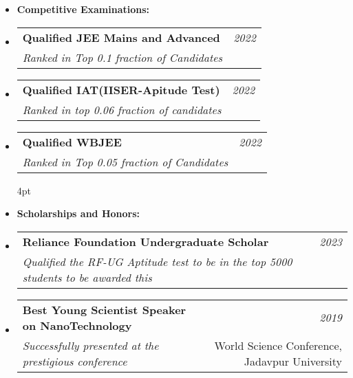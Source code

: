 \documentclass[a4paper,11pt]{article}
\makeatletter
\newcommand{\resumeSubheading}[4]{
    \item\small{
        \begin{tabular*}{0.97\textwidth}[t]{l@{\extracolsep{\fill}}r}
            \textbf{#1} & \textit{#2} \\
            \textit{#3} & \small{#4}
        \end{tabular*}
    }\vspace{3pt}
}
\newcommand{\denseList}[1]{
    \begin{customitemize}[leftmargin=5pt,nosep,itemsep=0.5pt]
        #1
    \end{customitemize}\vspace{1pt}
}
\makeatother
\begin{document}
{\begin{itemize}[leftmargin=*,label={},itemsep=4pt]
\begin{itemize}[nosep, label ={}]
    \item \textbf{Competitive Examinations:}
    \resumeSubheading{Qualified JEE Mains and Advanced}{2022}
    {Ranked in Top 0.1 fraction of Candidates}{}\vspace{-4pt}
    \resumeSubheading{Qualified IAT(IISER-Apitude Test)}{2022}
    {Ranked in top 0.06 fraction of candidates}{}\vspace{-4pt}
    \resumeSubheading{Qualified WBJEE}{2022}
    {Ranked in Top 0.05 fraction of Candidates}

    

    \vspace{4pt}\item \textbf{Scholarships and Honors:}
    \resumeSubheading{Reliance Foundation Undergraduate Scholar}{2023}
    {Qualified the RF-UG Aptitude test to be in the top 5000 students to be awarded this} {}\vspace{-2pt}
    \resumeSubheading{Best Young Scientist Speaker on NanoTechnology}{2019}
    {Successfully presented at the prestigious conference }{World Science Conference, Jadavpur University}
    
\end{itemize}
    \end{itemize}


}
\end{document}

